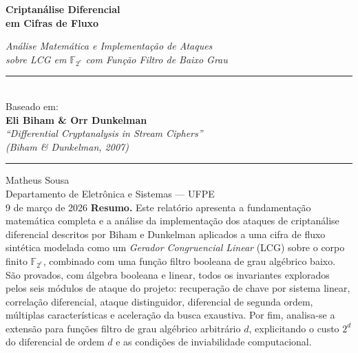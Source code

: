 \documentclass[12pt,a4paper]{article}
\theoremstyle{definition}
\theoremstyle{remark}
\newcommand{\GF}[1]{\mathbb{F}_{2^{#1}}}
\begin{document}
\begin{titlepage}
  \centering
  \vspace*{2cm}
  {\Huge\bfseries Criptanálise Diferencial\\[0.4em]
   em Cifras de Fluxo\par}
  \vspace{1cm}
  {\Large\itshape Análise Matemática e Implementação de Ataques\\
   sobre LCG em $\GF{e}$ com Função Filtro de Baixo Grau\par}
  \vspace{2cm}
  \rule{0.8\textwidth}{0.4pt}\\[0.5em]
  {\large
    Baseado em:\\[0.3em]
    \textbf{Eli Biham \& Orr Dunkelman}\\
    \textit{``Differential Cryptanalysis in Stream Ciphers''}\\
    \textit{(Biham \& Dunkelman, 2007)}
  }\\[0.5em]
  \rule{0.8\textwidth}{0.4pt}
  \vspace{2cm}

  {\large Matheus Sousa\\
    Departamento de Eletrônica e Sistemas --- UFPE}\\[0.5em]
  {\large 9 de março de 2026}
  \vfill
  {\small
    \textbf{Resumo.} Este relatório apresenta a fundamentação matemática
    completa e a análise da implementação dos ataques de criptanálise diferencial
    descritos por Biham e Dunkelman aplicados a uma cifra de fluxo sintética
    modelada como um \emph{Gerador Congruencial Linear} (LCG) sobre o corpo
    finito $\GF{e}$, combinado com uma função filtro booleana de grau algébrico
    baixo. São provados, com álgebra booleana e linear, todos os invariantes
    explorados pelos seis módulos de ataque do projeto:
    recuperação de chave por sistema linear, correlação diferencial, ataque
    distinguidor, diferencial de segunda ordem, múltiplas características e
    aceleração da busca exaustiva. Por fim, analisa-se a extensão para funções
    filtro de grau algébrico arbitrário $d$, explicitando o custo $2^d$ do
    diferencial de ordem $d$ e as condições de inviabilidade computacional.
  }
\end{titlepage}

\tableofcontents
\newpage

\end{document}
